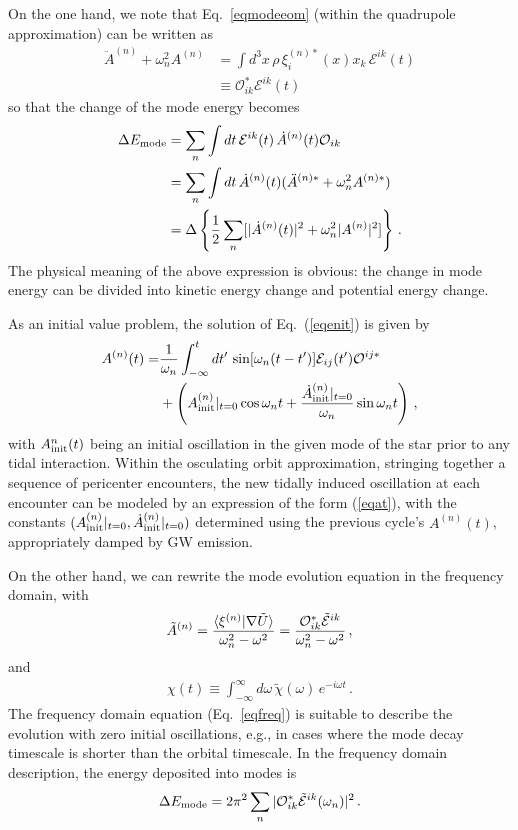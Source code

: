 \documentclass[prd,aps,floatfix,superscriptaddress,nofootinbib,twocolumn,10pt,English]{revtex4}
\begin{document}
On the one hand, we  note that Eq.~\eqref{eqmodeeom} (within the quadrupole approximation) can be written as 
\begin{align}\label{eqenit}
\ddot A^{(n)}+\omega^2_n A^{(n)} &=  \int d^3 x\, \rho\, \xi^{(n)*}_i(x) x_k \,\mathcal{E}^{ik}(t) \nonumber\\
& \equiv \mathcal{O}^*_{ik} \mathcal{E}^{ik}(t)\,
\end{align}
so that the change of the mode energy  becomes
\begin{align}\label{eqem}
 \Delta E_{\rm mode} & = \sum_n \int dt\, \mathcal{E}^{ik}(t)\, \dot{A}^{(n)}(t) \mathcal{O}_{ik}  \nonumber \\
 & =\sum_n \int dt\, \dot{A}^{(n)}(t) (\ddot{A}^{(n)*}+\omega_n^2 A^{(n)*})  \nonumber \\
 &=\Delta \left \{\frac{1}{2} \sum_n [ |\dot{A}^{(n)}(t) |^2+\omega^2_n |A^{(n)}|^2 ]\right \}\,.
    \end{align} 
The physical meaning of the above expression is obvious: the change in mode energy  can be divided into kinetic energy change and potential energy change. 

As an initial value problem, the solution of Eq.~(\ref{eqenit}) is given by
\begin{align}\label{eqat}
A^{(n)}(t) = &\frac{1}{\omega_n}\int^t_{-\infty} d t'\,\sin [\omega_n (t-t')] \mathcal{E}_{ij}(t') \mathcal{O}^{ij*} \nonumber \\
&+\left (A^{(n)}_{\rm init}|_{t=0} \cos{\omega_n t} +\frac{\dot{A}^{(n)}_{\rm init}|_{t=0} }{\omega_n} \sin{\omega_n t}\right )\,,
\end{align}
with $A^{n}_{\rm init}(t)$ being an initial oscillation in the given mode of the star prior to any tidal interaction.
Within the osculating orbit approximation, stringing together a sequence of pericenter encounters, 
the new tidally induced oscillation at each encounter can be modeled by an expression of the form (\ref{eqat}),
with the constants $(A^{(n)}_{\rm init}|_{t=0}, \dot{A}^{(n)}_{\rm init}|_{t=0})$ determined 
using the previous cycle's $A^{(n)}(t)$, appropriately damped by GW emission.

On the other hand, we can rewrite the mode evolution equation in the frequency domain, with
\begin{align}\label{eqfreq}
\tilde{A}^{(n)} =\frac{\langle {\bf \xi}^{(n)} | \nabla \tilde{U} \rangle}{\omega^2_n-\omega^2}=\frac{\mathcal{O}^*_{ik} \tilde{\mathcal{E}}^{ik}}{\omega^2_n-\omega^2}\,,
\end{align}
and
\begin{align}
\chi(t) \equiv \int^\infty_{-\infty} d \omega \, \tilde{\chi}(\omega )\, e^{-i \omega t}\,.
\end{align}
The frequency domain equation (Eq.~\eqref{eqfreq}) is suitable to describe the evolution 
with zero initial oscillations, e.g., in cases where the mode decay timescale is shorter than 
the orbital timescale. 
In the frequency domain description, the energy deposited into modes is \cite{press1977formation}
\begin{align}
\Delta E_{\rm mode} =2 \pi^2 \sum_n |\mathcal{O}^*_{ik} \tilde{\mathcal{E}}^{ik}(\omega_n)|^2\,.
\end{align}
\end{document}
